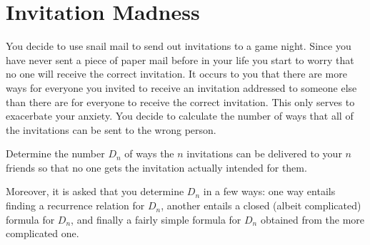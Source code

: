 \documentclass[answers]{exam}
\begin{document}
	\section{Invitation Madness}
	\begin{questions}
		
		\question You decide to use snail mail to send out invitations to a game night. Since you have never sent a piece of paper mail before in your life you start to worry that no one will receive the correct invitation. It occurs to you that there are more ways for everyone you invited to receive an invitation addressed to someone else than there are for everyone to receive the correct invitation.  This only serves to exacerbate your anxiety. You decide to calculate the number of ways that all of the invitations can be sent to the wrong person. 
		
		Determine the number $D_n$ of ways the $n$ invitations can be delivered to your $n$ friends so that no one gets the invitation actually intended for them.  
		
		Moreover, it is asked that you determine $D_n$ in a few ways: one way entails finding a recurrence relation for $D_n$, another entails a closed (albeit complicated) formula for $D_n$, and finally a fairly simple formula for $D_n$ obtained from the more complicated one. 
		
\end{questions}
\end{document}
